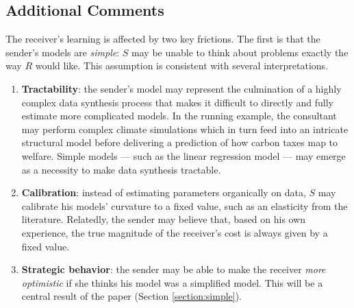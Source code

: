 \documentclass[11pt,dvipsnames]{article}
\begin{document}
\subsection{Additional Comments}

The receiver's learning is affected by two key frictions. The first is that the sender's models are \emph{simple}: $S$ may be unable to think about problems exactly the way $R$ would like.
This assumption is consistent with several interpretations.
\begin{enumerate}
\item \textbf{Tractability}: the sender's model may represent the culmination of a highly complex data synthesis process that makes it difficult to directly and fully estimate more complicated models. In the running example, the consultant may perform complex climate simulations which in turn feed into an intricate structural model before delivering a prediction of how carbon taxes map to welfare. Simple models --- such as the linear regression model --- may emerge as a necessity to make data synthesis tractable.
\item \textbf{Calibration}: instead of estimating parameters organically on data, $S$ may calibrate his models' curvature to a fixed value, such as an elasticity from the literature. Relatedly, the sender may believe that, based on his own experience, the true magnitude of the receiver's cost is always given by a fixed value.
\item \textbf{Strategic behavior}: the sender may be able to make the receiver \emph{more optimistic} if she thinks his model was a simplified model. This will be a central result of the paper (Section \ref{section:simple}).
\end{enumerate}
\end{document}
